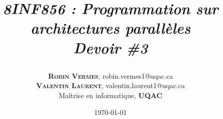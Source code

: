 \makeatletter
\renewcommand\@biblabel[1]{\textbf{#1.}} %
\renewcommand{\@listI}{\itemsep=0pt} %

\renewcommand{\maketitle}{ %
    \begin{flushright} %
    {\LARGE\@title} %

    \vspace{50pt} %

    {\large\@author} %
    \\\@date %

\vspace{40pt} %
\end{flushright}
}

\title{\begin{center}
\textit{8INF856 : Programmation sur architectures parallèles}\\ 
\textbf{\textit{Devoir \#3}}
\end{center}} %

\author{\textbf{\textsc{Robin Vermes}}, robin.vermes1@uqac.ca\\
	\textbf{\textsc{Valentin Laurent}}, valentin.laurent1@uqac.ca \\ %
	Maîtrise en informatique, \textbf{UQAC}} %

\date{\today} %
